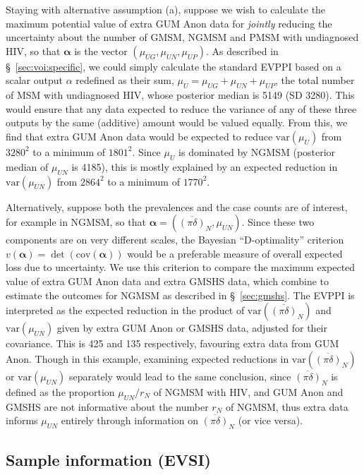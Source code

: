 \documentclass[12pt]{article}\usepackage[]{graphicx}\usepackage[]{color}
\newcommand{\cov}{\mbox{cov}}
\newcommand{\var}{\mbox{var}}
\newcommand{\pinodelta}{\overline{(\pi\delta)}}
\begin{document}
Staying with alternative assumption (a), suppose we wish to calculate the maximum potential value of extra GUM Anon data for \emph{jointly} reducing the uncertainty about the number of GMSM, NGMSM and PMSM with undiagnosed HIV, so that $\bm\alpha$ is the vector $(\mu_{UG},\mu_{UN},\mu_{UP})$.  As described in \S~\ref{sec:voi:specific}, we could simply calculate the standard EVPPI based on a scalar output $\alpha$ redefined as their sum, $\mu_U = \mu_{UG}+\mu_{UN}+\mu_{UP}$, the total number of MSM with undiagnosed HIV, whose posterior median is 5149 (SD 3280).  This would ensure that any data expected to reduce the variance of any of these three outputs by the same (additive) amount would be valued equally.  From this, we find that extra GUM Anon data would be expected to reduce $\var(\mu_U)$ from $3280^2$ to a minimum of $1801^2$.    Since $\mu_U$ is dominated by NGMSM (posterior median of $\mu_{UN}$ is 4185), this is mostly explained by an expected reduction in $\var(\mu_{UN})$ from $2864^2$ to a minimum of $1770^2$.



Alternatively, suppose both the prevalences and the case counts are of interest, for example in NGMSM, so that $\bm\alpha = (\pinodelta_N, \mu_{UN})$.  Since these two components are on very different scales, the Bayesian ``D-optimality'' criterion $v(\bm\alpha) = \det(\cov(\bm\alpha))$ would be a preferable measure of overall expected loss due to uncertainty.   We use this criterion to compare the maximum expected value of extra GUM Anon data and extra GMSHS data, which combine to estimate the outcomes for NGMSM as described in \S~\ref{sec:gmshs}.  The EVPPI is interpreted as the expected reduction in the product of $\var(\pinodelta_N)$ and $\var(\mu_{UN})$ given by extra GUM Anon or GMSHS data, adjusted for their covariance. This is 425 and 135 respectively, favouring extra data from GUM Anon.  Though in this example, examining expected reductions in $\var(\pinodelta_N)$ or $\var(\mu_{UN})$ separately would lead to the same conclusion, since $\pinodelta_N$ is defined as the proportion $\mu_{UN} / r_N$ of NGMSM with HIV, and GUM Anon and GMSHS are not informative about the number $r_N$ of NGMSM, thus extra data informs $\mu_{UN}$ entirely through information on $\pinodelta_N$ (or vice versa). 


\subsection{Sample information (EVSI)}
\label{res:evsi}
\end{document}
